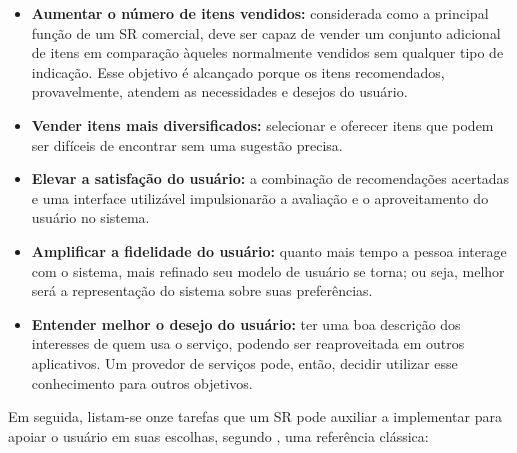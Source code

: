 \documentclass[portuguese]{textolivre}
\begin{document}
\begin{itemize}
    \item \textbf{Aumentar o número de itens vendidos:} considerada como a principal função de um SR comercial, deve ser capaz de vender um conjunto adicional de itens em comparação àqueles normalmente vendidos sem qualquer tipo de indicação. Esse objetivo é alcançado porque os itens recomendados, provavelmente, atendem as necessidades e desejos do usuário.
    
     \item \textbf{Vender itens mais diversificados:} selecionar e oferecer itens que podem ser difíceis de encontrar sem uma sugestão precisa.
     
     \item \textbf{Elevar a satisfação do usuário:} a combinação de recomendações acertadas e uma interface utilizável impulsionarão a avaliação e o aproveitamento do usuário no sistema.
     
     \item \textbf{Amplificar a fidelidade do usuário:} quanto mais tempo a pessoa interage com o sistema, mais refinado seu modelo de usuário se torna; ou seja, melhor será a  representação do sistema sobre suas preferências.
      
      \item \textbf{Entender melhor o desejo do usuário:} ter uma boa descrição dos interesses de quem usa o serviço, podendo ser reaproveitada em outros aplicativos. Um provedor de serviços pode, então, decidir utilizar esse conhecimento para outros objetivos.
     
\end{itemize}

 Em seguida, listam-se onze tarefas que um SR pode auxiliar a implementar para apoiar o usuário em suas escolhas, segundo \textcite{Herlocker:2004:ECF:963770.963772}, uma referência clássica:
\end{document}
